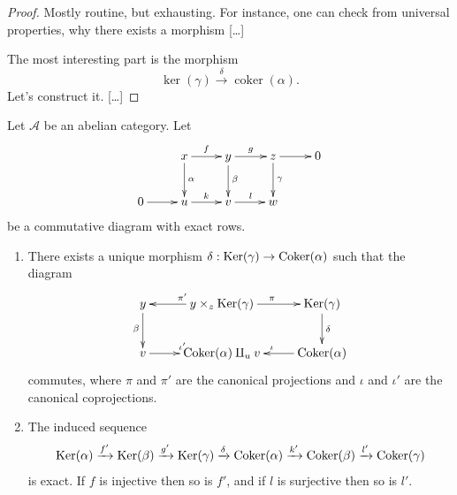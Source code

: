 \begin{proof}
Mostly routine, but exhausting.
For instance, one can check from
universal properties, why there
exists a morphism […]

The most interesting part is the 
morphism
$$
\ker(\gamma)\xrightarrow{\delta}
\operatorname{coker}(\alpha).
$$
Let's construct it. […]
\end{proof}

\begin{lemma}
\label{lemma-snake}
Let $\mathcal{A}$ be an abelian category. Let
$$
\xymatrix{
& x \ar[r]^f \ar[d]^\alpha &
y \ar[r]^g \ar[d]^\beta &
z \ar[r] \ar[d]^\gamma &
0 \\
0 \ar[r] & u \ar[r]^k & v \ar[r]^l & w
}
$$
be a commutative diagram with exact rows.
\begin{enumerate}
\item There exists a unique morphism
$\delta : \mathop{\mathrm{Ker}}(\gamma) \to \mathop{\mathrm{Coker}}(\alpha)$
such that the diagram
$$
\xymatrix{
y \ar[d]_\beta &
y \times_z \Ker(\gamma) \ar[l]_{\pi'}
\ar[r]^{\pi} &
\Ker(\gamma) \ar[d]^\delta \\
v \ar[r]^{\iota'} & \Coker(\alpha) \amalg_u v
&
\Coker(\alpha) \ar[l]_\iota
}
$$
commutes, where $\pi$ and $\pi'$ are the
canonical projections
and $\iota$ and $\iota'$ are the canonical
coprojections.
\item The induced sequence
$$
\mathop{\mathrm{Ker}}(\alpha) \xrightarrow{f'} \mathop{\mathrm{Ker}}(\beta)
\xrightarrow{g'}
\mathop{\mathrm{Ker}}(\gamma) \xrightarrow{\delta}
\mathop{\mathrm{Coker}}(\alpha) \xrightarrow{k'}
\mathop{\mathrm{Coker}}(\beta) \xrightarrow{l'} \mathop{\mathrm{Coker}}(\gamma)
$$
is exact. If $f$ is injective then so is
$f'$, and if $l$ is
surjective then so is $l'$.
\end{enumerate}
\end{lemma}

